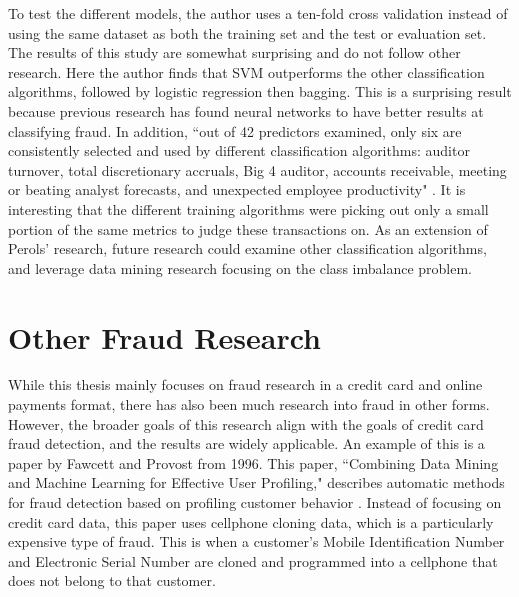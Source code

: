 \documentclass[midd]{thesis}
\begin{document}
To test the different models, the author uses a ten-fold cross validation instead of using the same dataset as both the training set and the test or evaluation set. The results of this study are somewhat surprising and do not follow other research. Here the author finds that SVM outperforms the other classification algorithms, followed by logistic regression then bagging. This is a surprising result because previous research has found neural networks to have better results at classifying fraud. In addition, ``out of 42 predictors examined, only six are consistently selected and used by different classification algorithms: auditor turnover, total discretionary accruals, Big 4 auditor, accounts receivable, meeting or beating analyst forecasts, and unexpected employee productivity" \cite{Perols2011}. It is interesting that the different training algorithms were picking out only a small portion of the same metrics to judge these transactions on. As an extension of Perols' research, future research could examine other classification algorithms, and leverage data mining research focusing on the class imbalance problem. 


\section{Other Fraud Research}

While this thesis mainly focuses on fraud research in a credit card and online payments format, there has also been much research into fraud in other forms. However, the broader goals of this research align with the goals of credit card fraud detection, and the results are widely applicable. An example of this is a paper by Fawcett and Provost from 1996. This paper, ``Combining Data Mining and Machine Learning for Effective User Profiling," describes automatic methods for fraud detection based on profiling customer behavior \cite{Fawcett1996}. Instead of focusing on credit card data, this paper uses cellphone cloning data, which is a particularly expensive type of fraud. This is when a customer's Mobile Identification Number and Electronic Serial Number are cloned and programmed into a cellphone that does not belong to that customer. 
\end{document}
